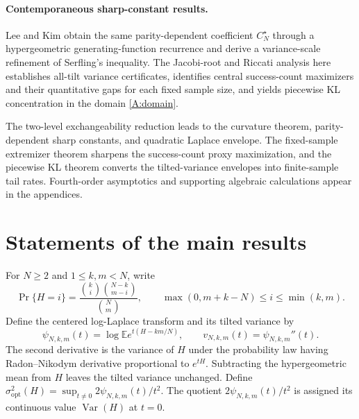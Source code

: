 \documentclass[11pt,a4paper]{article}
\DeclareMathOperator{\Var}{Var}\DeclareMathOperator{\Cov}{Cov}\DeclareMathOperator{\Hyp}{Hyp}\DeclareMathOperator{\Bern}{Bern}\DeclareMathOperator{\supp}{supp}\DeclareMathOperator{\artanh}{artanh}
\newcommand{\E}{\mathbb E}\newcommand{\R}{\mathbb R}\newcommand{\N}{\mathbb N}\newcommand{\one}{\mathbf1}
\begin{document}
\paragraph{Contemporaneous sharp-constant results.}
Lee and Kim \cite{LeeKimSerfling} obtain the same parity-dependent coefficient $C_N^\star$ through a hypergeometric generating-function recurrence and derive a variance-scale refinement of Serfling's inequality. The Jacobi-root and Riccati analysis here establishes all-tilt variance certificates, identifies central success-count maximizers and their quantitative gaps for each fixed sample size, and yields piecewise KL concentration in the domain \eqref{A:domain}.

The two-level exchangeability reduction leads to the curvature theorem, parity-dependent sharp constants, and quadratic Laplace envelope. The fixed-sample extremizer theorem sharpens the success-count proxy maximization, and the piecewise KL theorem converts the tilted-variance envelopes into finite-sample tail rates. Fourth-order asymptotics and supporting algebraic calculations appear in the appendices.

\section{Statements of the main results}\label{sec:main}
For $N\ge2$ and $1\le k,m<N$, write
\begin{equation}\label{eq:hypergeom}
 \Pr\{H=i\}=\frac{\binom ki\binom{N-k}{m-i}}{\binom Nm},
 \qquad \max(0,m+k-N)\le i\le\min(k,m).
\end{equation}
Define the centered log-Laplace transform and its tilted variance by
\begin{equation}\label{eq:psi}
 \psi_{N,k,m}(t)=\log\E e^{t(H-km/N)},\qquad
 v_{N,k,m}(t)=\psi_{N,k,m}''(t).
\end{equation}
The second derivative is the variance of $H$ under the probability law having Radon--Nikodym derivative proportional to $e^{tH}$. Subtracting the hypergeometric mean from $H$ leaves the tilted variance unchanged. Define $\sigma^2_{\mathrm{opt}}(H)=\sup_{t\ne0}2\psi_{N,k,m}(t)/t^2$. The quotient $2\psi_{N,k,m}(t)/t^2$ is assigned its continuous value $\Var(H)$ at $t=0$.
\end{document}
